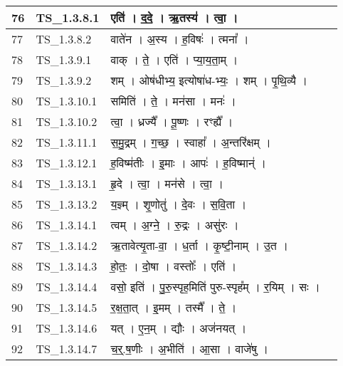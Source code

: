 \documentclass[17pt]{extarticle}
\begin{document}
\begin{longtable}{||p{0.4in}||p{0.9in}||p{4.0in}||p{0.9in}||}
        \hline
            76 & TS\_1.3.8.1 & एति॑   ।   द॒दे॒   ।   ऋ॒तस्य॑   ।   त्वा॒   ।    &      \\
        \hline
            77 & TS\_1.3.8.2 & वाते॑न   ।   अ॒स्य   ।   ह॒विषः॑   ।   त्मना᳚   ।    &      \\
        \hline
            78 & TS\_1.3.9.1 & वाक्   ।   ते॒   ।   एति॑   ।   प्या॒य॒ता॒म्   ।    &      \\
        \hline
            79 & TS\_1.3.9.2 & शम्   ।   ओष॑धीभ्य॒ इत्योषा॑ध{-}भ्यः॒   ।   शम्   ।   पृ॒थि॒व्यै   ।    &      \\
        \hline
            80 & TS\_1.3.10.1 & समिति॑   ।   ते॒   ।   मन॑सा   ।   मनः॑   ।    &      \\
        \hline
            81 & TS\_1.3.10.2 & त्वा॒   ।   ध्रज्यै᳚   ।   पू॒ष्णः   ।   रꣳह्यै᳚   ।    &      \\
        \hline
            82 & TS\_1.3.11.1 & स॒मु॒द्रम्   ।   ग॒च्छ॒   ।   स्वाहा᳚   ।   अ॒न्तरि॑क्षम्   ।    &      \\
        \hline
            83 & TS\_1.3.12.1 & ह॒विष्म॑तीः   ।   इ॒माः   ।   आपः॑   ।   ह॒विष्मान्॑   ।    &      \\
        \hline
            84 & TS\_1.3.13.1 & हृ॒दे   ।   त्वा॒   ।   मन॑से   ।   त्वा॒   ।    &      \\
        \hline
            85 & TS\_1.3.13.2 & य॒ज्ञ्म्   ।   शृ॒णोतु॑   ।   दे॒वः   ।   स॒वि॒ता   ।    &      \\
        \hline
            86 & TS\_1.3.14.1 & त्वम्   ।   अ॒ग्ने॒   ।   रु॒द्रः   ।   असु॑रः   ।    &      \\
        \hline
            87 & TS\_1.3.14.2 & ऋ॒तावेत्यृ॒ता{-}वा॒   ।   ध॒र्ता   ।   कृ॒ष्टी॒नाम्   ।   उ॒त   ।    &      \\
        \hline
            88 & TS\_1.3.14.3 & हो॒तः॒   ।   दो॒षा   ।   वस्तोः᳚   ।   एति॑   ।    &      \\
        \hline
            89 & TS\_1.3.14.4 & वसो॒ इति॑   ।   पु॒रु॒स्पृह॒मिति॑ पुरु{-}स्पृह᳚म्   ।   र॒यिम्   ।   सः   ।    &      \\
        \hline
            90 & TS\_1.3.14.5 & र॒क्ष॒ता॒त्   ।   इ॒मम्   ।   तस्मै᳚   ।   ते॒   ।    &      \\
        \hline
            91 & TS\_1.3.14.6 & यत्   ।   ए॒न॒म्   ।   द्यौः   ।   अज॑नयत्   ।    &      \\
        \hline
            92 & TS\_1.3.14.7 & च॒र्॒.ष॒णीः   ।   अ॒भीति॑   ।   आ॒सा   ।   वाजे॑षु   ।    &      \\

\end{longtable}
\end{document}
